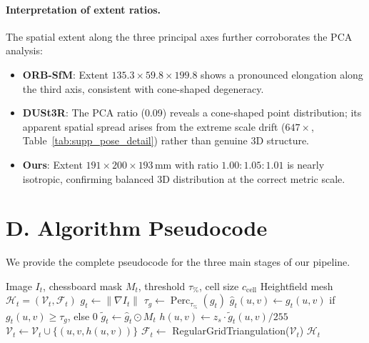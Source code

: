 \documentclass[review]{elsarticle}
\begin{document}
\paragraph{Interpretation of extent ratios.}
The spatial extent along the three principal axes further corroborates the PCA analysis:
\begin{itemize}[noitemsep]
    \item \textbf{ORB-SfM}: Extent $135.3 \times 59.8 \times 199.8$ shows a pronounced elongation along the third axis, consistent with cone-shaped degeneracy.
    \item \textbf{DUSt3R}: The PCA ratio (0.09) reveals a cone-shaped point distribution; its apparent spatial spread arises from the extreme scale drift ($647\times$, Table~\ref{tab:supp_pose_detail}) rather than genuine 3D structure.
    \item \textbf{Ours}: Extent $191 \times 200 \times 193$\,mm with ratio $1.00:1.05:1.01$ is nearly isotropic, confirming balanced 3D distribution at the correct metric scale.
\end{itemize}

\section*{D. Algorithm Pseudocode}

We provide the complete pseudocode for the three main stages of our pipeline.

\begin{algorithm}[h]
\caption{Pseudo-3D Heightfield Mesh Construction}
\label{alg:heightfield}
\begin{algorithmic}[1]
\REQUIRE Image $I_t$, chessboard mask $M_t$, threshold $\tau_{\%}$, cell size $c_{\mathrm{cell}}$
\ENSURE Heightfield mesh $\mathcal{H}_t = (\mathcal{V}_t, \mathcal{F}_t)$
\STATE $g_t \leftarrow \|\nabla I_t\|$ 
\STATE $\tau_g \leftarrow \operatorname{Perc}_{\tau_{\%}}(g_t)$ 
\STATE $\hat{g}_t(u,v) \leftarrow g_t(u,v)$ if $g_t(u,v) \geq \tau_g$, else $0$
\STATE $\tilde{g}_t \leftarrow \hat{g}_t \odot M_t$ 
    \STATE $h(u,v) \leftarrow z_s \cdot \tilde{g}_t(u,v) / 255$ 
    \STATE $\mathcal{V}_t \leftarrow \mathcal{V}_t \cup \{(u,v,h(u,v))\}$
\ENDFOR
\STATE $\mathcal{F}_t \leftarrow$ RegularGridTriangulation($\mathcal{V}_t$)
\RETURN $\mathcal{H}_t$
\end{algorithmic}
\end{algorithm}
\end{document}
